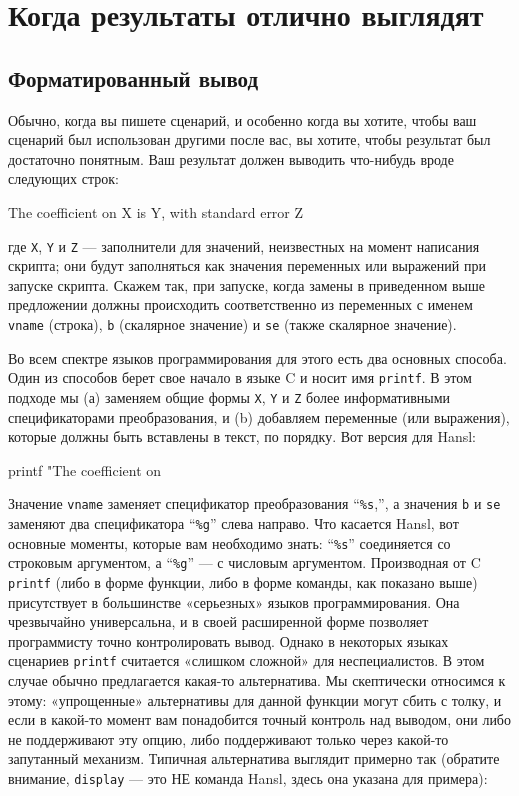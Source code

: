 \chapter{Когда результаты отлично выглядят}
\label{chap:formatting}

\section{Форматированный вывод}
\label{sec:printf}

Обычно, когда вы пишете сценарий, и особенно когда вы хотите, чтобы
ваш сценарий был использован другими после вас, вы хотите, чтобы
результат был достаточно понятным. Ваш результат должен выводить
что-нибудь вроде следующих строк:
\begin{code}
The coefficient on X is Y, with standard error Z
\end{code}
где \texttt{X}, \texttt{Y} и \texttt{Z} --- заполнители для значений,
неизвестных на момент написания скрипта; они будут заполняться как
значения переменных или выражений при запуске скрипта. Скажем так, при
запуске, когда замены в приведенном выше предложении должны
происходить соответственно из переменных с именем \texttt{vname}
(строка), \texttt{b} (скалярное значение) и \texttt{se} (также
скалярное значение).

Во всем спектре языков программирования для этого есть два основных
способа. Один из способов берет свое начало в языке \textsf{C} и носит
имя \texttt{printf}. В этом подходе мы (а) заменяем общие формы
\texttt{X}, \texttt{Y} и \texttt{Z} более информативными
спецификаторами преобразования, и (b) добавляем переменные (или
выражения), которые должны быть вставлены в текст, по порядку. Вот
версия для Hansl:
\begin{code}
printf "The coefficient on %
\end{code}
Значение \texttt{vname} заменяет спецификатор преобразования
``\texttt{\%s},'', а значения \texttt{b} и \texttt{se} заменяют два
спецификатора ``\texttt{\%g}'' слева направо. Что касается Hansl, вот
основные моменты, которые вам необходимо знать: ``\texttt{\%s}''
соединяется со строковым аргументом, а ``\texttt{\%g}'' --- с числовым
аргументом.  Производная от \textsf{C} \texttt{printf} (либо в форме
функции, либо в форме команды, как показано выше) присутствует в
большинстве «серьезных» языков программирования. Она чрезвычайно
универсальна, и в своей расширенной форме позволяет программисту точно
контролировать вывод.  Однако в некоторых языках сценариев
\texttt{printf} считается «слишком сложной» для неспециалистов. В этом
случае обычно предлагается какая-то альтернатива. Мы скептически
относимся к этому: «упрощенные» альтернативы для данной функции могут
сбить с толку, и если в какой-то момент вам понадобится точный
контроль над выводом, они либо не поддерживают эту опцию, либо
поддерживают только через какой-то запутанный механизм. Типичная
альтернатива выглядит примерно так (обратите внимание,
\texttt{display} --- это НЕ команда Hansl, здесь она указана для
примера):


